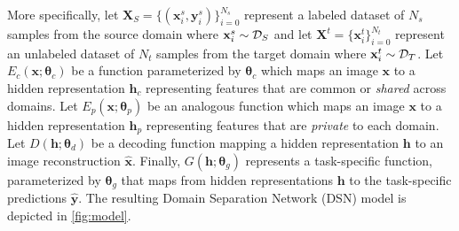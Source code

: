 \documentclass{article}
\newcommand{\bs}[1]{\boldsymbol{\mathbf{#1}}}
\begin{document}
More specifically, 
let ${\bs X}_S = \{({\bs x}_i^s, {\bs y}_i^s)\}_{i=0}^{N_s}$ represent a labeled dataset
of $N_s$ samples from the source domain where ${\bs x}_i^s \sim {\cal D}_S$ and let
${\bs X}^t = \{{\bs x}_i^t\}_{i=0}^{N_t}$ represent an unlabeled dataset of $N_t$
samples from the target domain where ${\bs x}_i^t \sim {\cal D}_T$. Let
$E_c(\bs x;\bs \theta_c)$ be a function parameterized by $\bs \theta_c$ which maps
an image $\bs x $ to a hidden representation $\bs h_c$ representing features 
that are common or
\textit{shared} across domains. Let $E_p(\bs x;\bs \theta_p)$ be
an analogous function which maps an image $\bs x$ to a hidden representation
$\bs h_p$ representing features that are \textit{private} to each domain.
Let $D(\bs h;\bs  \theta_d)$ be a decoding function mapping a hidden representation
$\bs h$ to an image reconstruction $\hat{\bs x}$. Finally, $G(\bs h; \bs \theta_g)$
represents a task-specific function, parameterized by $\bs \theta_g$ that maps from
hidden representations $\bs h$ to the task-specific predictions $\hat{\bs y}$. The resulting Domain Separation Network (DSN) model is depicted in \autoref{fig:model}.
\end{document}
